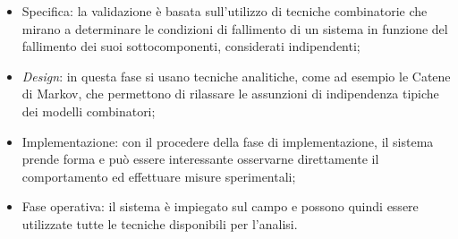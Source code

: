 \begin{itemize}
	\item Specifica: la validazione \`e basata sull'utilizzo di tecniche combinatorie che mirano a determinare le condizioni di fallimento di un sistema in funzione del fallimento dei suoi sottocomponenti, considerati indipendenti;
	\item \emph{Design}: in questa fase si usano tecniche analitiche, come ad esempio le Catene di Markov, che permettono di rilassare le assunzioni di indipendenza tipiche dei modelli combinatori;
	\item Implementazione: con il procedere della fase di implementazione, il sistema prende forma e pu\`o essere interessante osservarne direttamente il comportamento ed effettuare misure sperimentali;
	\item Fase operativa: il sistema \`e impiegato sul campo e possono quindi essere utilizzate tutte le tecniche disponibili per l'analisi.
\end{itemize}


